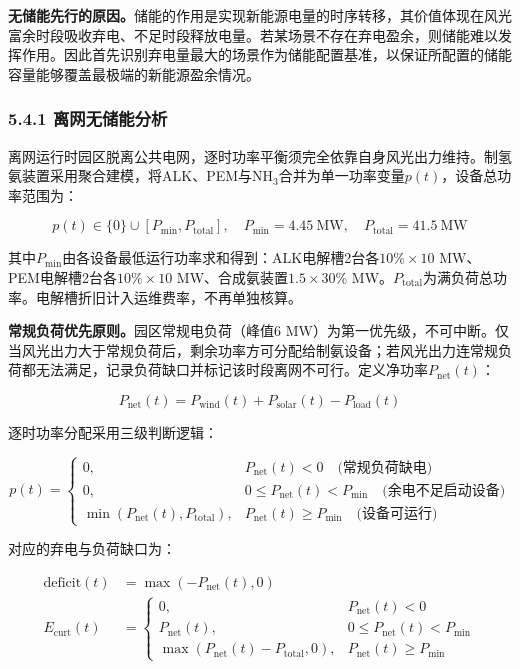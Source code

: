 \documentclass[zihao=-4,a4paper]{ctexart} %
\begin{document}
\textbf{无储能先行的原因。}储能的作用是实现新能源电量的时序转移，其价值体现在风光富余时段吸收弃电、不足时段释放电量。若某场景不存在弃电盈余，则储能难以发挥作用。因此首先识别弃电量最大的场景作为储能配置基准，以保证所配置的储能容量能够覆盖最极端的新能源盈余情况。

\subsubsection*{5.4.1 离网无储能分析}

离网运行时园区脱离公共电网，逐时功率平衡须完全依靠自身风光出力维持。制氢氨装置采用聚合建模，将ALK、PEM与NH$_3$合并为单一功率变量$p(t)$，设备总功率范围为：

\begin{equation}
	p(t) \in \{0\} \cup [P_{\min}, P_{\text{total}}], \quad P_{\min}=4.45\ \text{MW}, \quad P_{\text{total}}=41.5\ \text{MW}
	\label{eq:q4_p_range}
\end{equation}

其中$P_{\min}$由各设备最低运行功率求和得到：ALK电解槽2台各$10\%\times10$ MW、PEM电解槽2台各$10\%\times10$ MW、合成氨装置$1.5\times30\%$ MW。$P_{\text{total}}$为满负荷总功率。电解槽折旧计入运维费率，不再单独核算。

\textbf{常规负荷优先原则。}园区常规电负荷（峰值6 MW）为第一优先级，不可中断。仅当风光出力大于常规负荷后，剩余功率方可分配给制氨设备；若风光出力连常规负荷都无法满足，记录负荷缺口并标记该时段离网不可行。定义净功率$P_{\text{net}}(t)$：

\begin{equation}
	P_{\text{net}}(t) = P_{\text{wind}}(t) + P_{\text{solar}}(t) - P_{\text{load}}(t)
	\label{eq:q4_net}
\end{equation}

逐时功率分配采用三级判断逻辑：

\begin{equation}
	p(t) =
	\begin{cases}
		0, & P_{\text{net}}(t) < 0 \quad\text{(常规负荷缺电)} \\[6pt]
		0, & 0 \leq P_{\text{net}}(t) < P_{\min} \quad\text{(余电不足启动设备)} \\[6pt]
		\min(P_{\text{net}}(t), P_{\text{total}}), & P_{\text{net}}(t) \geq P_{\min} \quad\text{(设备可运行)}
	\end{cases}
	\label{eq:q4_p_decision}
\end{equation}

对应的弃电与负荷缺口为：

\begin{align}
	\text{deficit}(t) &= \max(-P_{\text{net}}(t), 0) \label{eq:q4_deficit} \\[4pt]
	E_{\text{curt}}(t) &=
	\begin{cases}
		0, & P_{\text{net}}(t) < 0 \\
		P_{\text{net}}(t), & 0 \leq P_{\text{net}}(t) < P_{\min} \\
		\max(P_{\text{net}}(t) - P_{\text{total}}, 0), & P_{\text{net}}(t) \geq P_{\min}
	\end{cases} \label{eq:q4_curt}
\end{align}
\end{document}
